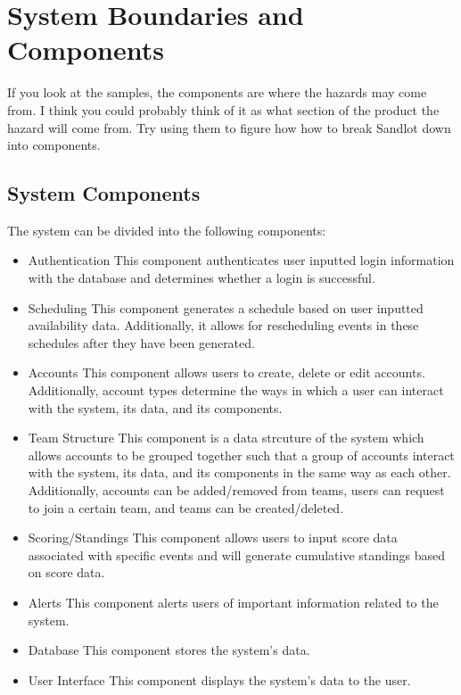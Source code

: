 \documentclass{article}
\begin{document}
\section{System Boundaries and Components}


If you look at the samples, the components are where the hazards may come from.
I think you could probably think of it as what section of the product the hazard will come from.
Try using them to figure how how to break Sandlot down into components.

\subsection{System Components}
The system can be divided into the following components:
\begin{itemize}
    \item Authentication
    \subitem This component authenticates user inputted login information with the database
    and determines whether a login is successful.
    \item Scheduling
    \subitem This component generates a schedule based on user inputted availability data. 
    Additionally, it allows for rescheduling events in these schedules after they 
    have been generated.
    \item Accounts
    \subitem This component allows users to create, delete or edit accounts. Additionally, account types 
    determine the ways in which a user can interact with the system, its data, and its components.
    \item Team Structure
    \subitem This component is a data strcuture of the system which allows accounts to be grouped together 
    such that a group of accounts interact with the system, its data, and its components in the same way as 
    each other. Additionally, accounts can be added/removed from teams, users can request to join a 
    certain team, and teams can be created/deleted.
    \item Scoring/Standings
    \subitem This component allows users to input score data associated with specific events and will 
    generate cumulative standings based on score data.
    \item Alerts
    \subitem This component alerts users of important information related to the system.
    \item Database
    \subitem This component stores the system's data.
    \item User Interface
    \subitem This component displays the system's data to the user.
\end{itemize}
\end{document}
